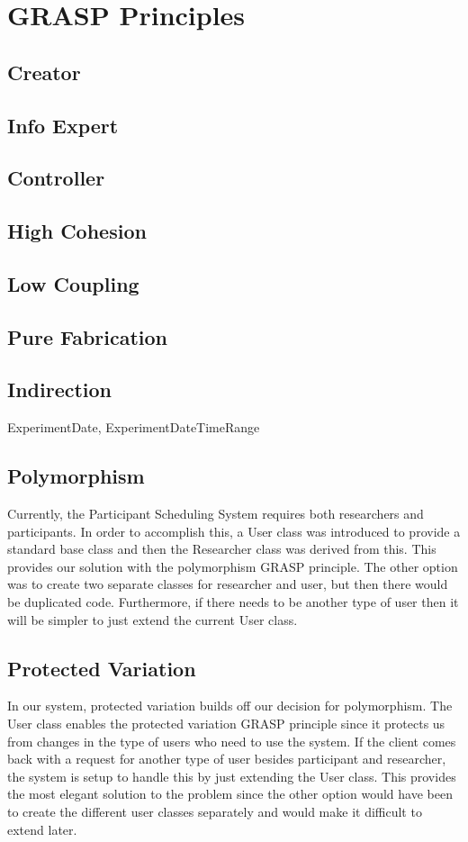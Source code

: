 \section{GRASP Principles}
\subsection{Creator}

\subsection{Info Expert}

\subsection{Controller}

\subsection{High Cohesion}

\subsection{Low Coupling}

\subsection{Pure Fabrication}

\subsection{Indirection}
ExperimentDate, ExperimentDateTimeRange

\subsection{Polymorphism}
Currently, the Participant Scheduling System requires both researchers and participants. In order to accomplish this, a User class was introduced to provide a standard base class and then the Researcher class was derived from this. This provides our solution with the polymorphism GRASP principle. The other option was to create two separate classes for researcher and user, but then there would be duplicated code. Furthermore, if there needs to be another type of user then it will be simpler to just extend the current User class.

\subsection{Protected Variation}
In our system, protected variation builds off our decision for polymorphism. The User class enables the protected variation GRASP principle since it protects us from changes in the type of users who need to use the system. If the client comes back with a request for another type of user besides participant and researcher, the system is setup to handle this by just extending the User class. This provides the most elegant solution to the problem since the other option would have been to create the different user classes separately and would make it difficult to extend later.